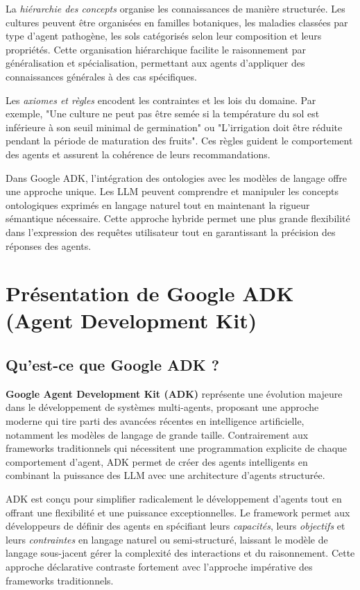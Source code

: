 La \emph{hiérarchie des concepts} organise les connaissances de manière structurée. Les cultures peuvent être organisées en familles botaniques, les maladies classées par type d'agent pathogène, les sols catégorisés selon leur composition et leurs propriétés. Cette organisation hiérarchique facilite le raisonnement par généralisation et spécialisation, permettant aux agents d'appliquer des connaissances générales à des cas spécifiques.

Les \emph{axiomes et règles} encodent les contraintes et les lois du domaine. Par exemple, "Une culture ne peut pas être semée si la température du sol est inférieure à son seuil minimal de germination" ou "L'irrigation doit être réduite pendant la période de maturation des fruits". Ces règles guident le comportement des agents et assurent la cohérence de leurs recommandations.

Dans Google ADK, l'intégration des ontologies avec les modèles de langage offre une approche unique. Les LLM peuvent comprendre et manipuler les concepts ontologiques exprimés en langage naturel tout en maintenant la rigueur sémantique nécessaire. Cette approche hybride permet une plus grande flexibilité dans l'expression des requêtes utilisateur tout en garantissant la précision des réponses des agents.

\section{Présentation de Google ADK (Agent Development Kit)}

\subsection{Qu'est-ce que Google ADK ?}

\textbf{Google Agent Development Kit (ADK)} représente une évolution majeure dans le développement de systèmes multi-agents, proposant une approche moderne qui tire parti des avancées récentes en intelligence artificielle, notamment les modèles de langage de grande taille. Contrairement aux frameworks traditionnels qui nécessitent une programmation explicite de chaque comportement d'agent, ADK permet de créer des agents intelligents en combinant la puissance des LLM avec une architecture d'agents structurée.

ADK est conçu pour simplifier radicalement le développement d'agents tout en offrant une flexibilité et une puissance exceptionnelles. Le framework permet aux développeurs de définir des agents en spécifiant leurs \emph{capacités}, leurs \emph{objectifs} et leurs \emph{contraintes} en langage naturel ou semi-structuré, laissant le modèle de langage sous-jacent gérer la complexité des interactions et du raisonnement. Cette approche déclarative contraste fortement avec l'approche impérative des frameworks traditionnels.


